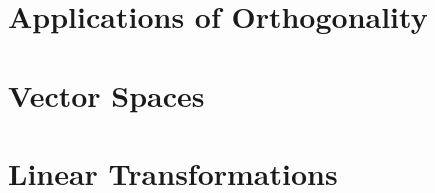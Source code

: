 \documentclass[11 pt]{book}
\begin{document}


\part{Applications of Orthogonality}



\part{Vector Spaces}






\part{Linear Transformations} 



\appendix




\backmatter


\printindex
%
\end{document}
